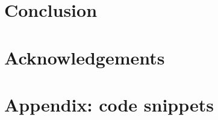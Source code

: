 \documentclass[reprint,aps,prd,superscriptaddress,showkeys,showpacs]{revtex4-1}
\begin{document}

\section{Conclusion}

 

\section*{Acknowledgements}


\section*{Appendix: code snippets}


\label{lastpage}
\end{document}
